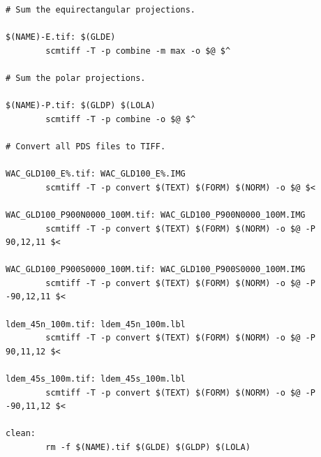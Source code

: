 \documentclass[oneside,10pt]{memoir}
\begin{document}
\begin{Spacing}{1.1}
\begin{Verbatim}
# Sum the equirectangular projections.

$(NAME)-E.tif: $(GLDE)
        scmtiff -T -p combine -m max -o $@ $^

# Sum the polar projections.

$(NAME)-P.tif: $(GLDP) $(LOLA)
        scmtiff -T -p combine -o $@ $^

# Convert all PDS files to TIFF.

WAC_GLD100_E%.tif: WAC_GLD100_E%.IMG
        scmtiff -T -p convert $(TEXT) $(FORM) $(NORM) -o $@ $<

WAC_GLD100_P900N0000_100M.tif: WAC_GLD100_P900N0000_100M.IMG
        scmtiff -T -p convert $(TEXT) $(FORM) $(NORM) -o $@ -P  90,12,11 $<

WAC_GLD100_P900S0000_100M.tif: WAC_GLD100_P900S0000_100M.IMG
        scmtiff -T -p convert $(TEXT) $(FORM) $(NORM) -o $@ -P -90,12,11 $<

ldem_45n_100m.tif: ldem_45n_100m.lbl
        scmtiff -T -p convert $(TEXT) $(FORM) $(NORM) -o $@ -P  90,11,12 $<

ldem_45s_100m.tif: ldem_45s_100m.lbl
        scmtiff -T -p convert $(TEXT) $(FORM) $(NORM) -o $@ -P -90,11,12 $<

clean:
        rm -f $(NAME).tif $(GLDE) $(GLDP) $(LOLA)
\end{Verbatim}

\printpagenotes
\end{Spacing}
\end{document}
